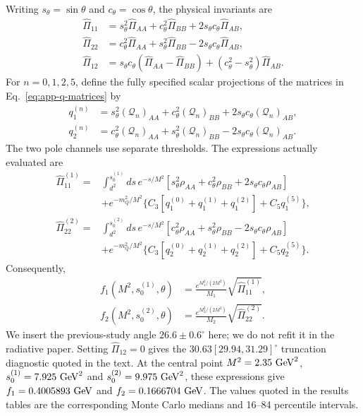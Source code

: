 \documentclass[11pt]{article}
\begin{document}
Writing $s_\theta=\sin\theta$ and $c_\theta=\cos\theta$, the physical
invariants are
\begin{align}
 \widehat\Pi_{11}&=s_\theta^2\widehat\Pi_{AA}
 +c_\theta^2\widehat\Pi_{BB}
 +2s_\theta c_\theta\widehat\Pi_{AB},\nonumber\\
 \widehat\Pi_{22}&=c_\theta^2\widehat\Pi_{AA}
 +s_\theta^2\widehat\Pi_{BB}
 -2s_\theta c_\theta\widehat\Pi_{AB},\nonumber\\
 \widehat\Pi_{12}&=s_\theta c_\theta
 (\widehat\Pi_{AA}-\widehat\Pi_{BB})
 +(c_\theta^2-s_\theta^2)\widehat\Pi_{AB}.
 \label{eq:app-rotated-pi}
\end{align}
For $n=0,1,2,5$, define the fully specified scalar projections of the matrices
in Eq.~\eqref{eq:app-q-matrices} by
\begin{align}
 q_1^{(n)}&=s_\theta^2(\mathcal Q_n)_{AA}
 +c_\theta^2(\mathcal Q_n)_{BB}
 +2s_\theta c_\theta(\mathcal Q_n)_{AB},\nonumber\\
 q_2^{(n)}&=c_\theta^2(\mathcal Q_n)_{AA}
 +s_\theta^2(\mathcal Q_n)_{BB}
 -2s_\theta c_\theta(\mathcal Q_n)_{AB}.
\end{align}
The two pole channels use separate thresholds.  The expressions actually
evaluated are
\begin{align}
 \widehat\Pi_{11}^{(1)}={}&
 \int_{d^2}^{s_0^{(1)}}ds\,e^{-s/M^2}
 [s_\theta^2\rho_{AA}+c_\theta^2\rho_{BB}
  +2s_\theta c_\theta\rho_{AB}]
 \nonumber\\
 &+e^{-m_Q^2/M^2}
 \{C_3[q_1^{(0)}+q_1^{(1)}+q_1^{(2)}]+C_5q_1^{(5)}\},
 \nonumber\\
 \widehat\Pi_{22}^{(2)}={}&
 \int_{d^2}^{s_0^{(2)}}ds\,e^{-s/M^2}
 [c_\theta^2\rho_{AA}+s_\theta^2\rho_{BB}
  -2s_\theta c_\theta\rho_{AB}]
 \nonumber\\
 &+e^{-m_Q^2/M^2}
 \{C_3[q_2^{(0)}+q_2^{(1)}+q_2^{(2)}]+C_5q_2^{(5)}\}.
\end{align}
Consequently,
\begin{align}
 \boxed{f_1(M^2,s_0^{(1)},\theta)}
 &=\frac{e^{M_1^2/(2M^2)}}{M_1}
 \sqrt{\widehat\Pi_{11}^{(1)}},\nonumber\\
 \boxed{f_2(M^2,s_0^{(2)},\theta)}
 &=\frac{e^{M_2^2/(2M^2)}}{M_2}
 \sqrt{\widehat\Pi_{22}^{(2)}}.
 \label{eq:app-decay-constants}
\end{align}
We insert the previous-study angle $26.6\pm0.6^\circ$
\cite{AlievBilmisSavci2024} here; we do not refit it in the radiative paper.
Setting $\widehat\Pi_{12}=0$ gives the
$30.63[29.94,31.29]^\circ$ truncation diagnostic quoted in the text.
At the central point
$M^2=2.35~{\rm GeV}^2$,
$s_0^{(1)}=7.925~{\rm GeV}^2$ and
$s_0^{(2)}=9.975~{\rm GeV}^2$, these expressions give
$f_1=0.4005893~{\rm GeV}$ and $f_2=0.1666704~{\rm GeV}$.  The values quoted
in the results tables are the corresponding Monte Carlo medians and
16--84 percentile intervals.
\end{document}
